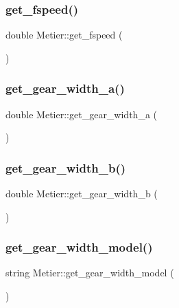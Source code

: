 \subsubsection{\texorpdfstring{get\_fspeed()}{get\_fspeed()}}
{\footnotesize\ttfamily double Metier\+::get\+\_\+fspeed (\begin{DoxyParamCaption}{ }\end{DoxyParamCaption})}

\mbox{\label{class_metier_a8d2006fc0d386f562824b85b9783ee30}} 
\subsubsection{\texorpdfstring{get\_gear\_width\_a()}{get\_gear\_width\_a()}}
{\footnotesize\ttfamily double Metier\+::get\+\_\+gear\+\_\+width\+\_\+a (\begin{DoxyParamCaption}{ }\end{DoxyParamCaption})}

\mbox{\label{class_metier_a4d3288ee6a2f5cb418ce7df47481db32}} 
\subsubsection{\texorpdfstring{get\_gear\_width\_b()}{get\_gear\_width\_b()}}
{\footnotesize\ttfamily double Metier\+::get\+\_\+gear\+\_\+width\+\_\+b (\begin{DoxyParamCaption}{ }\end{DoxyParamCaption})}

\mbox{\label{class_metier_a5d13c4593a42653746f3a84397c9613a}} 
\subsubsection{\texorpdfstring{get\_gear\_width\_model()}{get\_gear\_width\_model()}}
{\footnotesize\ttfamily string Metier\+::get\+\_\+gear\+\_\+width\+\_\+model (\begin{DoxyParamCaption}{ }\end{DoxyParamCaption})}

